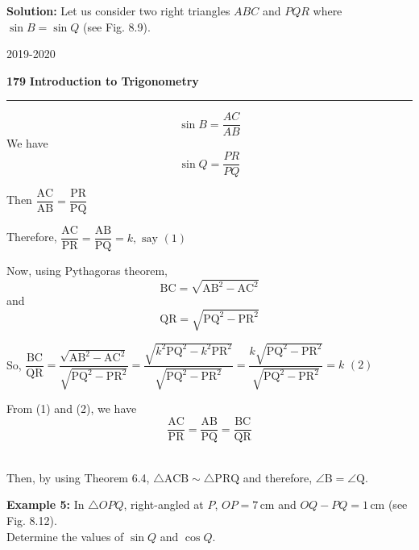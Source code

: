 \documentclass[12pt]{article}
\begin{document}
\vspace{0.5em}
\noindent
\textbf{\textcolor{headerblue}{Solution:}} Let us consider two right triangles $ABC$ and $PQR$ where $\sin B = \sin Q$ (see Fig. 8.9).
\[\]


\centerline{2019-2020}

\newpage
\noindent
\textcolor{headerblue}{\textbf{179}} \hfill 
\vspace{-9pt}
\textcolor{headerblue}{\textbf{Introduction to Trigonometry}} \\
\textcolor{headerblue}{\rule{\textwidth}{1pt}}

\vspace{1em}
\[
\sin B = \frac{AC}{AB}
\]
We have
\[
\sin Q = \frac{PR}{PQ}
\]

\noindent Then \hfill $\dfrac{\mathrm{AC}}{\mathrm{AB}} = \dfrac{\mathrm{PR}}{\mathrm{PQ}}$ \hfill \phantom{(0)}

\vspace{1em}

\noindent Therefore, \hfill $\dfrac{\mathrm{AC}}{\mathrm{PR}} = \dfrac{\mathrm{AB}}{\mathrm{PQ}} = k, \text{ say}$ \hfill $(1)$

\vspace{1em}

\noindent Now, using Pythagoras theorem, \[\mathrm{BC} = \sqrt{\mathrm{AB}^2 - \mathrm{AC}^2}\]
\noindent and 
\[\mathrm{QR} = \sqrt{\mathrm{PQ}^2 - \mathrm{PR}^2}\]

\vspace{1em}

\noindent So, \quad \quad \quad $\dfrac{\mathrm{BC}}{\mathrm{QR}} = \dfrac{\sqrt{\mathrm{AB}^2 - \mathrm{AC}^2}}{\sqrt{\mathrm{PQ}^2 - \mathrm{PR}^2}} = \dfrac{\sqrt{k^2\mathrm{PQ}^2 - k^2\mathrm{PR}^2}}{\sqrt{\mathrm{PQ}^2 - \mathrm{PR}^2}} = \dfrac{k\sqrt{\mathrm{PQ}^2 - \mathrm{PR}^2}}{\sqrt{\mathrm{PQ}^2 - \mathrm{PR}^2}} = k$ \hfill $(2)$

\vspace{1em}

\noindent From (1) and (2), we have \[ \dfrac{\mathrm{AC}}{\mathrm{PR}} = \dfrac{\mathrm{AB}}{\mathrm{PQ}} = \dfrac{\mathrm{BC}}{\mathrm{QR}}\]\

\vspace{1em}

\noindent Then, by using Theorem 6.4, $\triangle \mathrm{ACB} \sim \triangle \mathrm{PRQ}$ and therefore, $\angle \mathrm{B} = \angle \mathrm{Q}$.

\vspace{2em}
\noindent
\textbf{\textcolor{headerblue}{Example 5:}} In $\triangle OPQ$, right-angled at $P$,
\newline
$OP = 7\,\text{cm}$ and $OQ - PQ = 1\,\text{cm}$ (see Fig. 8.12). \\
Determine the values of $\sin Q$ and $\cos Q$.
\end{document}
